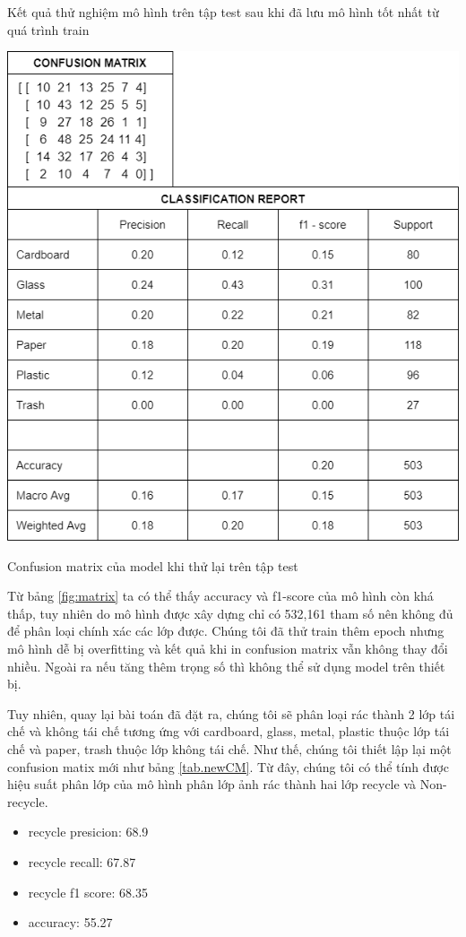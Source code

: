 Kết quả thử nghiệm mô hình trên tập test sau khi đã lưu mô hình tốt nhất từ quá trình train 
\begin{table}[H]
    \centering
    \includegraphics[width=\linewidth]{images/Quanh/matrix.png}
    \caption{Confusion matrix của model khi thử lại trên tập test}
    \label{fig:matrix}
\end{table}
Từ bảng \ref{fig:matrix} ta có thể thấy accuracy và f1-score của mô hình còn khá thấp, tuy nhiên do mô hình được xây dựng chỉ có 532,161 tham số nên không đủ để phân loại chính xác các lớp được. Chúng tôi đã thử train thêm epoch nhưng mô hình dễ bị overfitting và kết quả khi in confusion matrix vẫn không thay đổi nhiều. Ngoài ra nếu tăng thêm trọng số thì không thể sử dụng model trên thiết bị. 

Tuy nhiên, quay lại bài toán đã đặt ra, chúng tôi sẽ phân loại rác thành 2 lớp tái chế và không tái chế tương ứng với cardboard, glass, metal, plastic thuộc lớp tái chế và paper, trash thuộc lớp không tái chế. Như thế, chúng tôi thiết lập lại một confusion matix mới như bảng \ref{tab.newCM}. Từ đây, chúng tôi có thể tính được hiệu suất phân lớp của mô hình phân lớp ảnh rác thành hai lớp recycle và Non-recycle.

\begin{itemize}
    \item recycle presicion: 68.9%
    \item recycle recall: 67.87%
    \item recycle f1 score: 68.35%
    \item accuracy: 55.27%
\end{itemize}

